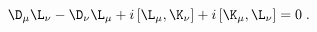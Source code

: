 \begin{equation}
  \label{eq:Lherm}
  \D_\mu\L_\nu-  \D_\nu\L_\mu + i \left[\L_\mu ,\K_\nu\right]+ i \left[\K_\mu ,\L_\nu\right] = 0 \; .
\end{equation}

